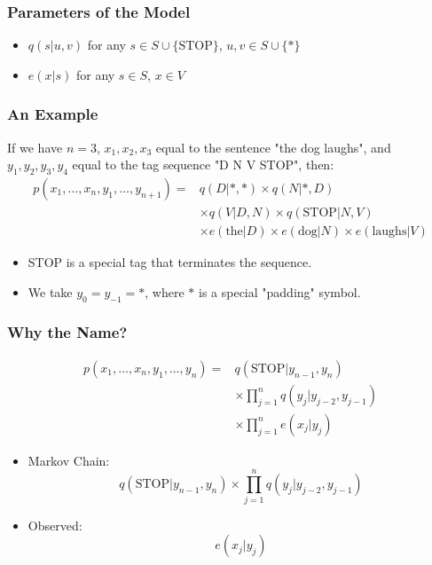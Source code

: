 \documentclass[handout]{beamer}
\begin{document}
\begin{frame}
  \frametitle{Parameters of the Model}
  \begin{itemize}
    \item $q(s|u, v)$ for any $s \in S \cup \{\text{STOP}\}$, $u, v \in S \cup \{*\}$
    \item $e(x|s)$ for any $s \in S$, $x \in V$
  \end{itemize}
\end{frame}

\begin{frame}
  \frametitle{An Example}
  \scriptsize
  If we have $n = 3$, $x_1, x_2, x_3$ equal to the sentence "the dog laughs", and $y_1, y_2, y_3, y_4$ equal to the tag sequence "D N V STOP", then:
\[
\begin{aligned}
p(x_1, \ldots, x_n, y_1, \ldots, y_{n+1}) = & q(D|*,*) \times q(N|*,D) \\
& \times q(V|D,N) \times q(\text{STOP}|N,V) \\
& \times e(\text{the}|D) \times e(\text{dog}|N) \times e(\text{laughs}|V)
\end{aligned}
\]
  \begin{itemize}
    \item STOP is a special tag that terminates the sequence.
    \item We take $y_0 = y_{-1} = *$, where $*$ is a special "padding" symbol.
  \end{itemize}
\end{frame}

\begin{frame}
  \frametitle{Why the Name?}
\[
\begin{aligned}
p(x_1, \ldots, x_n, y_1, \ldots, y_n) = & q(\text{STOP}|y_{n-1}, y_n) \\
& \times \prod_{j=1}^{n} q(y_j | y_{j-2}, y_{j-1}) \\
& \times \prod_{j=1}^{n} e(x_j | y_j)
\end{aligned}
\]
  \begin{itemize}
    \item Markov Chain:
    \[
      q(\text{STOP}|y_{n-1}, y_n)\times \prod_{j=1}^{n} q(y_j | y_{j-2}, y_{j-1})
    \]
    \item Observed:
    \[
      e(x_j | y_j)
    \]
  \end{itemize}
\end{frame}
\end{document}
